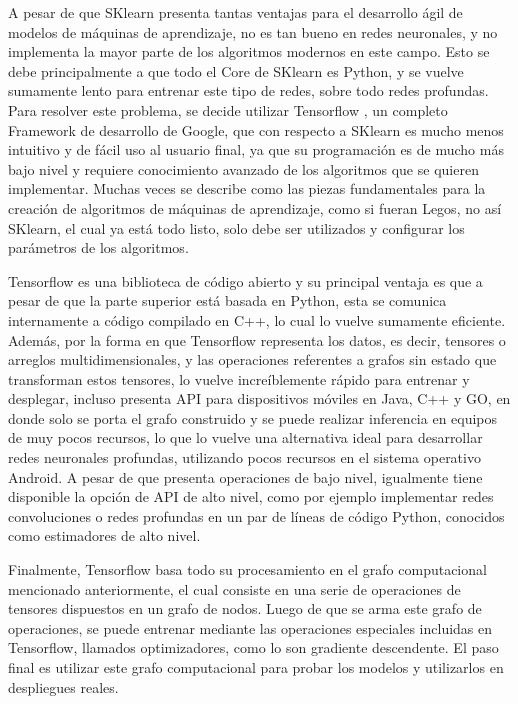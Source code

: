 A pesar de que SKlearn presenta tantas ventajas para el desarrollo ágil de modelos de máquinas de aprendizaje, no es tan bueno en redes neuronales, y no implementa la mayor parte de los algoritmos modernos en este campo. Esto se debe principalmente a que todo el Core de SKlearn es Python, y se vuelve sumamente lento para entrenar este tipo de redes, sobre todo redes profundas. Para resolver este problema, se decide utilizar Tensorflow \cite{tensorflow2015-whitepaper}, un completo Framework de desarrollo de Google, que con respecto a SKlearn es mucho menos intuitivo y de fácil uso al usuario final, ya que su programación es de mucho más bajo nivel y requiere conocimiento avanzado de los algoritmos que se quieren implementar.  Muchas veces se describe como las piezas fundamentales para la creación de algoritmos de máquinas de aprendizaje, como si fueran Legos, no así SKlearn, el cual ya está todo listo, solo debe ser utilizados y configurar los parámetros de los algoritmos.

Tensorflow es una biblioteca de código abierto y su principal ventaja es que a pesar de que la parte superior está basada en Python, esta se comunica internamente a código compilado en C++, lo cual lo vuelve sumamente eficiente. Además, por la forma en que Tensorflow representa los datos, es decir, tensores o arreglos multidimensionales, y las operaciones referentes a grafos sin estado que transforman estos tensores, lo vuelve increíblemente rápido para entrenar y desplegar, incluso presenta API para dispositivos móviles en Java, C++ y GO, en donde solo se porta el grafo construido y se puede realizar inferencia en equipos de muy pocos recursos, lo que lo vuelve una alternativa ideal para desarrollar redes neuronales profundas, utilizando  pocos recursos en el sistema operativo Android. A pesar de que presenta operaciones de bajo nivel, igualmente tiene disponible la opción de API de alto nivel, como por ejemplo implementar redes convoluciones o redes profundas en un par de líneas de código Python, conocidos como estimadores de alto nivel.

Finalmente, Tensorflow basa todo su procesamiento en el grafo computacional mencionado anteriormente, el cual consiste en una serie de operaciones de tensores dispuestos en un grafo de nodos. Luego de que se arma este grafo de operaciones, se puede entrenar mediante las operaciones especiales incluidas en Tensorflow, llamados optimizadores, como lo son gradiente descendente. El paso final es utilizar este grafo computacional para probar los modelos y utilizarlos en despliegues reales.


